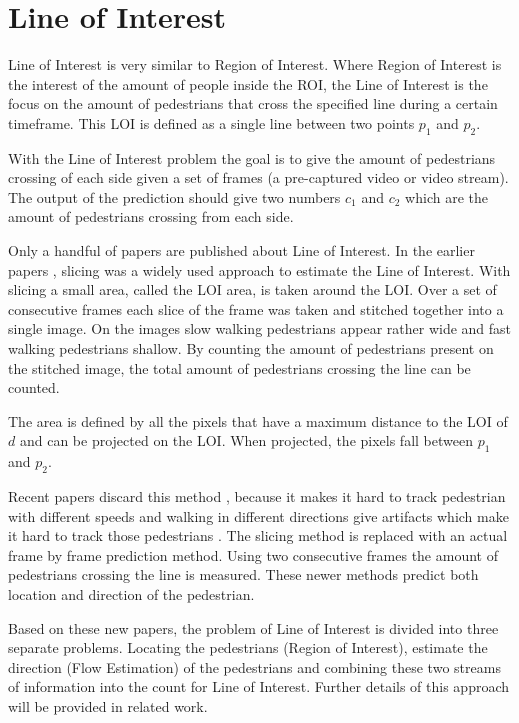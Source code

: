 \section{Line of Interest}
Line of Interest is very similar to Region of Interest. Where Region of Interest is the interest of the amount of people inside the ROI, the Line of Interest is the focus on the amount of pedestrians that cross the specified line during a certain timeframe. This LOI is defined as a single line between two points $p_1$ and $p_2$.

With the Line of Interest problem the goal is to give the amount of pedestrians crossing of each side given a set of frames (a pre-captured video or video stream). The output of the prediction should give two numbers $c_1$ and $c_2$ which are the amount of pedestrians crossing from each side.

Only a handful of papers are published about Line of Interest. In the earlier papers \cite{ma_counting_2016, cao_large_2015}, slicing was a widely used approach to estimate the Line of Interest. With slicing a small area, called the LOI area, is taken around the LOI. Over a set of consecutive frames each slice of the frame was taken and stitched together into a single image. On the images slow walking pedestrians appear rather wide and fast walking pedestrians shallow. By counting the amount of pedestrians present on the stitched image, the total amount of pedestrians crossing the line can be counted.

The area is defined by all the pixels that have a maximum distance to the LOI of $d$ and can be projected on the LOI. When projected, the pixels fall between $p_1$ and $p_2$.

Recent papers discard this method \cite{leibe_crossing-line_2016, zheng_cross-line_2019}, because it makes it hard to track pedestrian with different speeds and walking in different directions give artifacts which make it hard to track those pedestrians \cite{leibe_crossing-line_2016}. The slicing method is replaced with an actual frame by frame prediction method. Using two consecutive frames the amount of pedestrians crossing the line is measured. These newer methods predict both location and direction of the pedestrian. 

Based on these new papers, the problem of Line of Interest is divided into three separate problems. Locating the pedestrians (Region of Interest), estimate the direction (Flow Estimation) of the pedestrians and combining these two streams of information into the count for Line of Interest. Further details of this approach will be provided in related work.